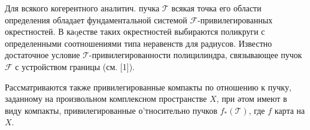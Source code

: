 \documentclass[10pt]{article}
\begin{document}
Для всякого когерентного аналитич. пучка $\mathscr{T}$ всякая точка его области определения обладает фундаментальной системой $\mathscr{F}$-привилегированных окрестностей. В каqестве таких окрестностей выбираются поликруги с определенными соотношениями типа неравенств для радиусов. Известно достаточное условие $\mathscr{T}$-привилегированности полицилиндра, связывающее пучок $\mathscr{F}$ с устройством границы (см. [1]).



Рассматриваются также привилегированные компакты по отношению к пучку, заданному на произвольном комплексном пространстве $X$, при әтом имеют в виду компакты, привилегированные о'тносительно пучков $f_{*}(\mathscr{T})$, где $f$ карта на $X$.
\end{document}
